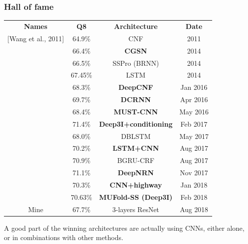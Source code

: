 	\subsubsection{Hall of fame}
	\begin{table}[h]
		\begin{tabular}{cccc}
			\textbf{Names} & \textbf{Q8} & \textbf{Architecture} & \textbf{Date} \\
			$[$Wang et al., 2011$]$	& 64.9\% 	& CNF 			& 2011 \\ 
			\cite{Zhou2014}	& 66.4\% 	& \textbf{CGSN} 			& 2014 \\ 
			\cite{Magnan2014} & 66.5\% & SSPro (BRNN) & 2014 \\
			\cite{Sønderby2014}	& 67.45\% 	& LSTM 			& 2014 	\\ 
			\cite{Wang2016} & 68.3\% & \textbf{DeepCNF} 	& Jan 2016 \\ 
			\cite{Li2016}	& 69.7\% 	& \textbf{DCRNN} 		& Apr 2016 \\
			\cite{Lin2016} 	& 68.4\% 	& \textbf{MUST-CNN} 		& May 2016 \\
			\cite{Busia2017}& 71.4\%& \textbf{Deep3I+conditioning}& Feb 2017 \\
			\cite{Hattori2017} & 68.0\%	& DBLSTM		& May 2017 \\
			\cite{Jurtz2017} & 70.2\%	& \textbf{LSTM+CNN} 		& Aug 2017 \\
			\cite{Johansen2017} & 70.9\% & BGRU-CRF & Aug 2017 \\
			\cite{8371925} & 71.1\% & \textbf{DeepNRN} & Nov 2017 \\
			\cite{Zhou2018} & 70.3\% & \textbf{CNN+highway} & Jan 2018 \\
			\cite{Fang2017}& 70.63\% & \textbf{MUFold-SS (Deep3I)}&Feb 2018\\
			
			Mine & 67.7\% & 3-layers ResNet & Aug 2018 \\ 
		\end{tabular}
	\end{table}
	
	A good part of the winning architectures are actually using CNNs, either alone, or in combinations with other methods.
